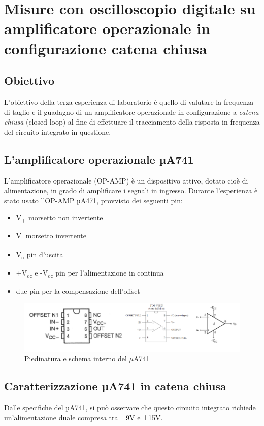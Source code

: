 \chapter{Misure con oscilloscopio digitale su amplificatore operazionale in configurazione catena chiusa}
\label{chap:terza_prova}

\section*{Obiettivo}
\label{sec:ob_third}
L'obiettivo della terza esperienza di laboratorio è quello di valutare la frequenza di taglio e il guadagno di un amplificatore operazionale in configurazione a \emph{catena chiusa} (closed-loop) al fine di effettuare il tracciamento della risposta in frequenza del circuito integrato in questione.

\section{L'amplificatore operazionale µA741}
L'amplificatore operazionale (OP-AMP) è un dispositivo attivo, dotato cioè di alimentazione, in grado  di amplificare i segnali in ingresso. Durante l'esperienza è stato usato l'OP-AMP µA471, provvisto dei seguenti pin:
\begin{itemize}
    \item V\textsubscript{+} morsetto non invertente
    \item V\textsubscript{-} morsetto invertente
    \item V\textsubscript{o} pin d'uscita
    \item +V\textsubscript{cc} e -V\textsubscript{cc} pin per l'alimentazione in continua
    \item due pin per la compensazione dell'offset
\end{itemize}

\begin{figure}
    \centering
    \includegraphics[width=1\linewidth]{media/uA741.png}
    \caption{Piedinatura e schema interno del $\mu$A741}
    \label{fig:Piedinatura e schema interno del uA741}
\end{figure}
\FloatBarrier
\section{Caratterizzazione µA741 in catena chiusa}
Dalle specifiche del µA741, si può osservare che questo circuito integrato richiede un’alimentazione duale compresa tra ±9V e ±15V.


